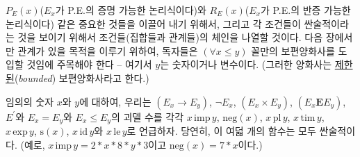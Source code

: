 \documentclass[12pt]{paper}
\begin{document}
$P_E \left( x \right)$($E_x$가 P.E.의 증명 가능한 논리식이다)와 $R_E \left( x \right)$($E_x$가 P.E.의 반증 가능한 논리식이다) 같은 중요한 것들을 이끌어 내기 위해서,
그리고 각 조건들이 싼술적이라는 것을 보이기 위해서 조건들(집합들과 관계들)의 체인을 나열할 것이다.
다음 장에서만 관계가 있을 목적을 이루기 위하여, 독자들은 $\left( \forall x \le y \right)$ 꼴만의 보편양화사를 도입할 것임에 주목해야 한다 -- 여기서 $y$는 숫자이거나 변수이다. (그러한 양화사는 \underline{제한된}(\textit{bounded}) 보편양화사라고 한다.)

임의의 숫자 $x$와 $y$에 대하여, 우리는 $\left( E_{x} \rightarrow E_{y} \right)$, $\lnot E_{x}$, $\left( E_{x} \times E_{y} \right)$, $\left( E_{x} \mathrm{\mathbf{E}} E_{y} \right)$, $E^{\prime}$와 $E_{x} = E_{y}$와 $E_{x} \le E_{y}$의 괴델 수를
각각 $x \, \mathrm{imp} \, y$, $\mathrm{neg} \left( x \right)$, $x \, \mathrm{pl} \, y$, $x \, \mathrm{tim} \, y$, $x \, \mathrm{exp} \, y$, $\mathrm{s} \left( x \right)$, $x \, \mathrm{id} \, y$와 $x \, \mathrm{le} \, y$로 언급하자.
당연히, 이 여덟 개의 함수는 모두 싼술적이다. (예로, $x \, \mathrm{imp} \, y = 2 * x * 8 * y * 3$이고 $\mathrm{neg} \left( x \right) = 7 * x$이다.)
\end{document}
